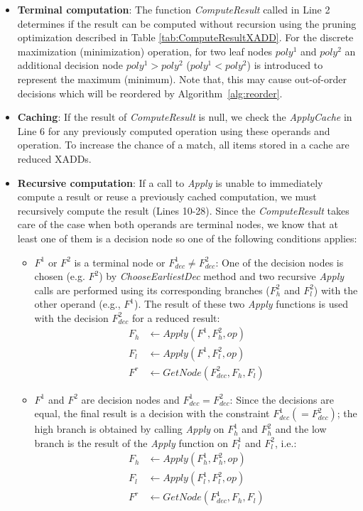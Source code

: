 \documentclass[twoside,11pt]{article}
\begin{document}
\decmargin{0.5em}
\begin{itemize}
\item \textbf{Terminal computation}: 
The function \emph{ComputeResult} called in Line 2 determines if the result can be computed without recursion using the pruning optimization described in Table \ref{tab:ComputeResultXADD}. For the discrete maximization (minimization) operation, for two leaf nodes $poly^1$ and $poly^2$ an additional decision node $poly^1 > poly^2$ ($poly^1 < poly^2$) is introduced to represent the maximum (minimum). Note that, this may cause out-of-order decisions which will be reordered by Algorithm~\ref{alg:reorder}. 

\item \textbf{Caching}:
If the result of \emph{ComputeResult} is null, we check the \emph{ApplyCache} in Line 6 for any previously computed operation using these operands and operation. To increase the chance of a match, all items stored in a cache are reduced XADDs.

\item \textbf{Recursive computation}:
If a call to \emph{Apply} is unable to immediately compute a result or reuse a previously cached computation, we must recursively compute the result (Lines 10-28). Since the \emph{ComputeResult} takes care of the case when both operands are terminal nodes, we know that at least one of them is a decision node so one of the following conditions applies: 
\begin{itemize}
\item $F^1$ or $F^2$ is a terminal node or $\mathit{F^1_{dec}}\neq \mathit{F^2_{dec}} $: One of the decision nodes is chosen (e.g. $F^2$) by 
\emph{ChooseEarliestDec} method and two recursive \emph{Apply} calls are performed using its corresponding branches ($F^2_{h}$ and 
$F^2_{l}$) with the other operand (e.g., $F^1$).
The result of these two \emph{Apply} functions is used with the decision $\mathit{F^2_{dec}}$ for a reduced result:
\begin{align*}
F_h & \leftarrow Apply (F^1 , F^2_{h},op) \\
F_l & \leftarrow Apply (F^1 , F^2_{l},op)  \\
F^r & \leftarrow GetNode (\mathit{F^2_{dec}} , F_h,F_l) 
\end{align*}
\item $F^1$ and $F^2$ are decision nodes and $\mathit{F^1_{dec}}=\mathit{F^2_{dec}} $: Since the decisions are equal, the final result is a decision with the constraint $\mathit{F^1_{dec}} (=\mathit{F^2_{dec}})$; the high branch is obtained by calling \emph{Apply} on $F_h^1$ and $F_h^2$ and the low branch is the result of the \emph{Apply} function on $F_l^1$ and $F_l^2$, i.e.:
\begin{align*}
F_h & \leftarrow Apply (F^1_{h} , F^2_{h},op)  \\
F_l & \leftarrow Apply (F^1_{l} , F^2_{l},op)  \\
F^r & \leftarrow GetNode (\mathit{F^1_{dec}} , F_h,F_l) 
\end{align*}
\end{itemize}
\end{itemize}
\end{document}
